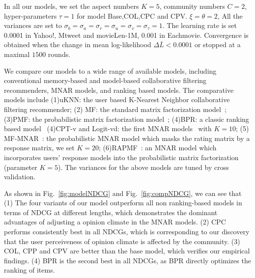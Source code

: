 \documentclass{sig-alternate}
\begin{document}
In all our models, we set the aspect numbers $K=5$, community numbers $C=2$, hyper-parameters  $\tau=1$ for model Base,COL,CPC and CPV.  $\xi=\theta=2$, All the variances are set to $\sigma_b=\sigma_a=\sigma_r=\sigma_u=\sigma_v=\sigma_\tau=1$. The learning rate is set 0.0001 in Yahoo!, Mtweet and movieLen-1M, 0.001 in Eachmovie. Convergence is obtained when the change in mean log-likelihood $\Delta\bar{L}<0.0001$ or stopped at a maximal $1500$ rounds.


We compare our models to a wide range of available models, including conventional memory-based and model-based collaborative filtering recommenders, MNAR models, and ranking based models. The comparative models include (1)uKNN: the user based K-Nearest Neighbor collaborative filtering recommender; (2) MF: the standard matrix factorization model~\cite{Koren2009Matrix}; (3)PMF: the probabilistic matrix factorization model~\cite{salakhutdinov2008probabilistic}; (4)BPR: a classic ranking based model~\cite{Rendle2009Bayesian} (4)CPT-v and Logit-vd: the first MNAR models~\cite{Marlin2009Collaborative} with $K=10$; (5) MF-MNAR~\cite{Hernandez-Lobato2014Probabilistic}: the probabilistic MNAR model which masks the rating matrix by a response matrix, we set $K=20$; (6)RAPMF~\cite{Yang2015Boosting}: an MNAR model which incorporates users' response models into the probabilistic matrix factorization (parameter $K=5$). The variances for the above models are tuned by cross validation.

As shown in Fig.~\ref{fig:modelNDCG} and Fig.~\ref{fig:compNDCG}, we can see that (1) The four variants of our model outperform all non ranking-based models in terms of NDCG at different lengths, which demonstrates the dominant advantages of adjusting a opinion climate in the MNAR models.  (2) CPC performs consistently best in all NDCGs, which is corresponding to our discovery that the user perceiveness of opinion climate is affected by the community. (3) COL, CPP and CPV are better than the base model, which verifies our empirical findings. (4) BPR is the second best in all NDCGs, as BPR directly optimizes the ranking of items.   
\end{document}
